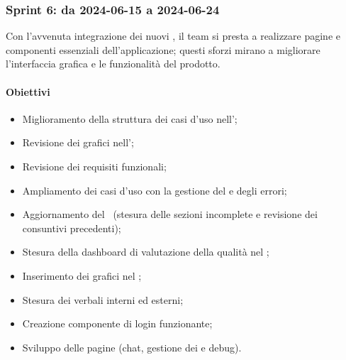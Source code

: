 \subsubsection{Sprint 6: da 2024-06-15 a 2024-06-24}
Con l'avvenuta integrazione dei nuovi , il team si presta a realizzare pagine e componenti essenziali dell'applicazione; questi sforzi mirano a migliorare l'interfaccia grafica e le funzionalità del prodotto.


\paragraph{Obiettivi}
\begin{itemize}
  \item Miglioramento della struttura dei casi d'uso nell'\AdR;
  \item Revisione dei grafici nell'\AdR;
  \item Revisione dei requisiti funzionali;
  \item Ampliamento dei casi d'uso con la gestione del  e degli errori;
  \item Aggiornamento del \PdP\ (stesura delle sezioni incomplete e revisione dei consuntivi precedenti);
  \item Stesura della dashboard di valutazione della qualità nel \PdQ;
  \item Inserimento dei grafici nel \PdQ;
  \item Stesura dei verbali interni ed esterni;
  \item Creazione componente di login funzionante;
  \item Sviluppo delle pagine  (chat, gestione dei  e debug).
\end{itemize}

\vspace{0.5\baselineskip}
\par [Inserire Gantt]
